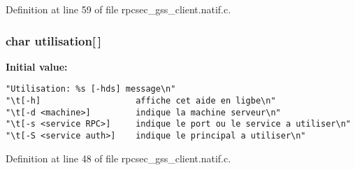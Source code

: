Definition at line 59 of file rpcsec\_\-gss\_\-client.natif.c.
\subsubsection{\setlength{\rightskip}{0pt plus 5cm}char {\bf utilisation}[$\,$]}\label{rpcsec__gss__client_8natif_8c_a11}


{\bf Initial value:}

\footnotesize\begin{verbatim}
"Utilisation: %s [-hds] message\n"
"\t[-h]                   affiche cet aide en ligbe\n"
"\t[-d <machine>]         indique la machine serveur\n"
"\t[-s <service RPC>]     indique le port ou le service a utiliser\n" 
"\t[-S <service auth>]    indique le principal a utiliser\n"
\end{verbatim}\normalsize 


Definition at line 48 of file rpcsec\_\-gss\_\-client.natif.c.